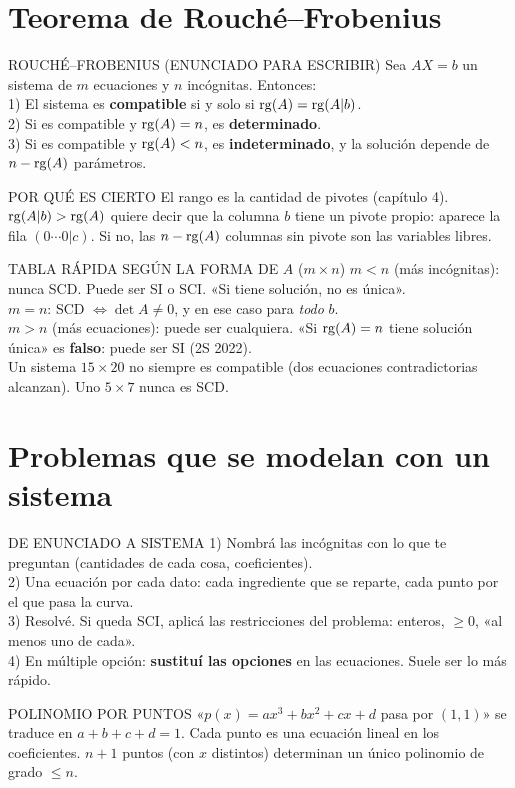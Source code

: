 \section{Teorema de Rouché--Frobenius}
\begin{sello}{ROUCHÉ--FROBENIUS (ENUNCIADO PARA ESCRIBIR)}
Sea $AX=b$ un sistema de $m$ ecuaciones y $n$ incógnitas. Entonces:\\[2pt]
1) El sistema es \textbf{compatible} si y solo si $\operatorname{rg}(A)=\operatorname{rg}(A|b)$.\\
2) Si es compatible y $\operatorname{rg}(A)=n$, es \textbf{determinado}.\\
3) Si es compatible y $\operatorname{rg}(A)<n$, es \textbf{indeterminado}, y la solución depende de $n-\operatorname{rg}(A)$ parámetros.
\end{sello}
\begin{tip}{POR QUÉ ES CIERTO}
El rango es la cantidad de pivotes (capítulo 4). $\operatorname{rg}(A|b)>\operatorname{rg}(A)$ quiere decir que la columna $b$ tiene un pivote propio: aparece la fila $(0\cdots0|c)$. Si no, las $n-\operatorname{rg}(A)$ columnas sin pivote son las variables libres.
\end{tip}
\begin{memo}{TABLA RÁPIDA SEGÚN LA FORMA DE $A$ ($m\times n$)}
$m<n$ (más incógnitas): nunca SCD. Puede ser SI o SCI. «Si tiene solución, no es única».\\
$m=n$: SCD $\iff\det A\neq0$, y en ese caso para \emph{todo} $b$.\\
$m>n$ (más ecuaciones): puede ser cualquiera. «Si $\operatorname{rg}(A)=n$ tiene solución única» es \textbf{falso}: puede ser SI (2S 2022).\\[2pt]
Un sistema $15\times20$ no siempre es compatible (dos ecuaciones contradictorias alcanzan). Uno $5\times7$ nunca es SCD.
\end{memo}

\section{Problemas que se modelan con un sistema}
\begin{metodo}{DE ENUNCIADO A SISTEMA}
1) Nombrá las incógnitas con lo que te preguntan (cantidades de cada cosa, coeficientes).\\
2) Una ecuación por cada dato: cada ingrediente que se reparte, cada punto por el que pasa la curva.\\
3) Resolvé. Si queda SCI, aplicá las restricciones del problema: enteros, $\ge0$, «al menos uno de cada».\\
4) En múltiple opción: \textbf{sustituí las opciones} en las ecuaciones. Suele ser lo más rápido.
\end{metodo}
\begin{memo}{POLINOMIO POR PUNTOS}
«$p(x)=ax^3+bx^2+cx+d$ pasa por $(1,1)$» se traduce en $a+b+c+d=1$. Cada punto es una ecuación lineal en los coeficientes. $n+1$ puntos (con $x$ distintos) determinan un único polinomio de grado $\le n$.
\end{memo}
